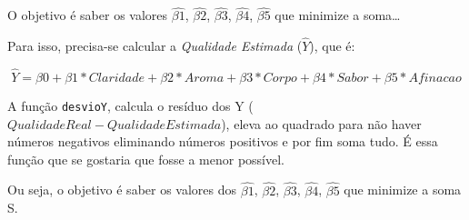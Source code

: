 \documentclass[
]{article}
\newenvironment{Shaded}{\begin{snugshade}}{\end{snugshade}}
\newcommand{\ControlFlowTok}[1]{\textcolor[rgb]{0.13,0.29,0.53}{\textbf{#1}}}
\newcommand{\DecValTok}[1]{\textcolor[rgb]{0.00,0.00,0.81}{#1}}
\newcommand{\KeywordTok}[1]{\textcolor[rgb]{0.13,0.29,0.53}{\textbf{#1}}}
\newcommand{\NormalTok}[1]{#1}
\newcommand{\OperatorTok}[1]{\textcolor[rgb]{0.81,0.36,0.00}{\textbf{#1}}}
\newcommand{\StringTok}[1]{\textcolor[rgb]{0.31,0.60,0.02}{#1}}
\begin{document}
O objetivo é saber os valores \(\widehat{\beta1}\),
\(\widehat{\beta2}\), \(\widehat{\beta3}\), \(\widehat{\beta4}\),
\(\widehat{\beta5}\) que minimize a soma\ldots{}

Para isso, precisa-se calcular a \emph{Qualidade Estimada}
(\(\widehat{Y}\)), que é:

\[
\widehat{Y} =  \beta0 + \beta1*Claridade + \beta2*Aroma + \beta3*Corpo + \beta4*Sabor + \beta5*Afinacao
\]

\begin{Shaded}
\end{Shaded}

A função \texttt{desvioY}, calcula o resíduo dos Y
(\(Qualidade Real - Qualidade Estimada\)), eleva ao quadrado para não
haver números negativos eliminando números positivos e por fim soma
tudo. É essa função que se gostaria que fosse a menor possível.

Ou seja, o objetivo é saber os valores dos \(\widehat{\beta1}\),
\(\widehat{\beta2}\), \(\widehat{\beta3}\), \(\widehat{\beta4}\),
\(\widehat{\beta5}\) que minimize a soma S.
\end{document}
